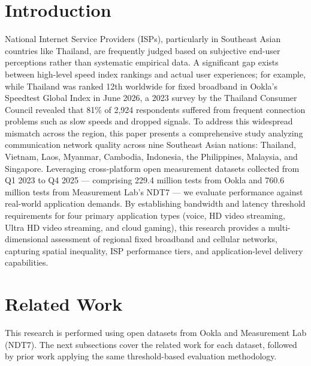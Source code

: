 \documentclass[sigconf,anonymous,review]{acmart}
\begin{document}
\section{Introduction}
National Internet Service Providers (ISPs), particularly in Southeast Asian
countries like Thailand, are frequently judged based on subjective end-user
perceptions rather than systematic empirical data. A significant gap exists
between high-level speed index rankings and actual user experiences; for
example, while Thailand was ranked 12th worldwide for fixed broadband in
Ookla's Speedtest Global Index in June 2026, a 2023 survey by the Thailand
Consumer Council revealed that 81\% of 2,924 respondents suffered from
frequent connection problems such as slow speeds and dropped signals. To
address this widespread mismatch across the region, this paper presents a
comprehensive study analyzing communication network quality across nine
Southeast Asian nations: Thailand, Vietnam, Laos, Myanmar, Cambodia,
Indonesia, the Philippines, Malaysia, and Singapore. Leveraging
cross-platform open measurement datasets collected from Q1 2023 to Q4
2025 --- comprising 229.4 million tests from Ookla and 760.6 million tests
from Measurement Lab's NDT7 --- we evaluate performance against real-world
application demands. By establishing bandwidth and latency threshold
requirements for four primary application types (voice, HD video streaming,
Ultra HD video streaming, and cloud gaming), this research provides a
multi-dimensional assessment of regional fixed broadband and cellular
networks, capturing spatial inequality, ISP performance tiers, and
application-level delivery capabilities.

\section{Related Work}
This research is performed using open datasets from Ookla and Measurement
Lab (NDT7). The next subsections cover the related work for each dataset,
followed by prior work applying the same threshold-based evaluation
methodology.
\end{document}

